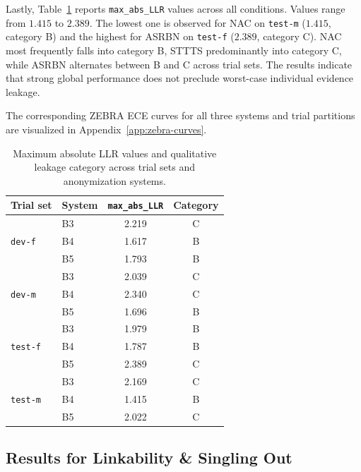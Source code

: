 \documentclass[12pt,leqno,a4paper]{article}
\begin{document}
Lastly, Table~\ref{tab:max_abs_llr_scores} reports \texttt{max\_abs\_LLR} values across all conditions. Values range from $1.415$ to $2.389$. The lowest one is observed for NAC on \texttt{test-m} ($1.415$, category B) and the highest for ASRBN on \texttt{test-f} ($2.389$, category C). NAC most frequently falls into category B, STTTS predominantly into category C, while ASRBN alternates between B and C across trial sets. The results indicate that strong 
global performance does not preclude worst-case individual evidence leakage.

The corresponding ZEBRA ECE curves for all three systems and trial partitions are visualized in Appendix~\ref{app:zebra-curves}.
\begin{table}[H]
\centering
\small
\setlength{\tabcolsep}{6pt}
\begin{tabular}{llcc}
\hline
Trial set & System & \texttt{max\_abs\_LLR} & Category \\
\hline
          & B3 & \color{red}2.219 & C \\
\texttt{dev-f}     & B4 & 1.617 & B \\
          & B5 & 1.793 & B \\
\hline
          & B3 & 2.039 & C \\
\texttt{dev-m}     & B4 & \color{red}2.340 & C \\
          & B5 & 1.696 & B \\
\hline
          & B3 & 1.979 & B \\
\texttt{test-f}    & B4 & 1.787 & B \\
          & B5 & \color{red}2.389 & C \\
\hline
          & B3 & \color{red}2.169 & C \\
\texttt{test-m}    & B4 & 1.415 & B \\
          & B5 & 2.022 & C \\
\hline
\end{tabular}
\caption{Maximum absolute LLR values and qualitative leakage category 
across trial sets and anonymization systems.}
\label{tab:max_abs_llr_scores}
\end{table}

\subsection{Results for Linkability \& Singling Out}
\label{subsec:results_linkability_and_singling_out}
\end{document}
